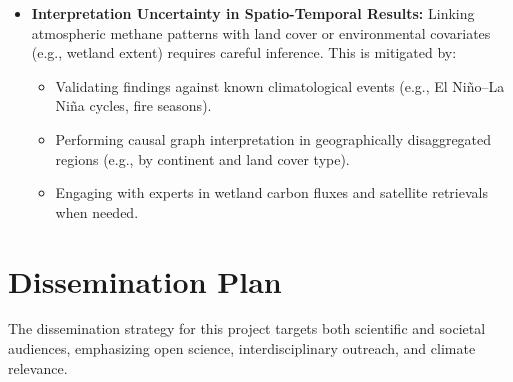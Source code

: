 \begin{itemize}
	\item \textbf{Interpretation Uncertainty in Spatio-Temporal Results:} Linking atmospheric methane patterns with land cover or environmental covariates (e.g., wetland extent) requires careful inference. This is mitigated by:
	      \begin{itemize}
		      \item Validating findings against known climatological events (e.g., El Niño–La Niña cycles, fire seasons).
		      \item Performing causal graph interpretation in geographically disaggregated regions (e.g., by continent and land cover type).
		      \item Engaging with experts in wetland carbon fluxes and satellite retrievals when needed.
	      \end{itemize}
\end{itemize}

\section{Dissemination Plan}

The dissemination strategy for this project targets both scientific and societal audiences, emphasizing open science, interdisciplinary outreach, and climate relevance.

